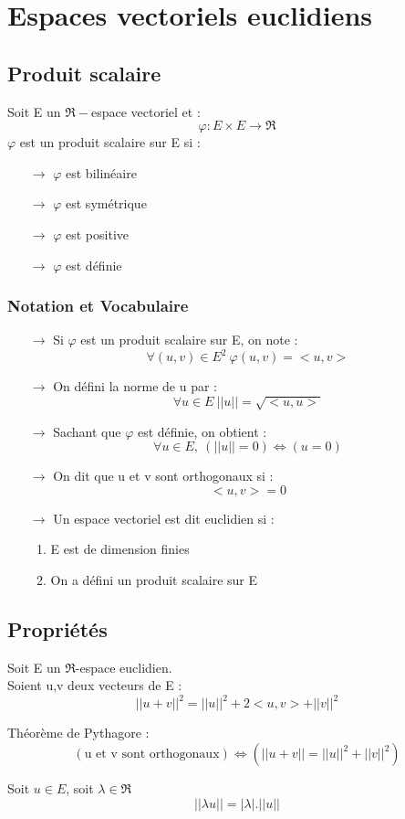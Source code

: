 
\chapter{Espaces vectoriels euclidiens}
\section{Produit scalaire}
\begin{de}
Soit E un $\Re-$espace vectoriel et :
$$\varphi : E\times E \rightarrow \Re$$
$\varphi$ est un produit scalaire sur E si :
\begin{itemize}
 \item[$\rightarrow$] $\varphi$ est bilinéaire
 \item[$\rightarrow$] $\varphi$ est symétrique
 \item[$\rightarrow$] $\varphi$ est positive
 \item[$\rightarrow$] $\varphi$ est définie
\end{itemize}
\end{de}
\subsection{Notation et Vocabulaire}
\begin{itemize}
\item[$\rightarrow$] Si $\varphi$ est un produit scalaire sur E, on note : $$\forall(u,v) \in E^2~ \varphi(u,v) = <u,v>$$
 \item[$\rightarrow$] On défini la norme de u par : $$\forall u \in E~ ||u|| = \sqrt{<u,u>}$$
 \item[$\rightarrow$] Sachant que $\varphi$ est définie, on obtient : $$\forall u \in E,~ (||u||=0) \Leftrightarrow (u=0)$$
 \item[$\rightarrow$] On dit que u et v sont orthogonaux si : $$<u,v>=0$$
 \item[$\rightarrow$] Un espace vectoriel est dit euclidien si : \begin{enumerate}[1-]
 \item E est de dimension finies 
 \item On a défini un produit scalaire sur E
\end{enumerate}
\end{itemize}
\section{Propriétés}
\begin{prop}
Soit E un $\Re$-espace euclidien.\\
Soient u,v deux vecteurs de E : 
$$||u+v||^2 = ||u||^2 + 2<u,v> + ||v||^2$$
\end{prop}
\begin{theo}
Théorème de Pythagore : $$(\mbox{u et v sont orthogonaux}) \Leftrightarrow (||u+v|| = ||u||^2+||v||^2)$$
\end{theo}
\begin{prop}
 Soit $u \in E$, soit $\lambda \in \Re$
$$||\lambda u|| = |\lambda|.||u||$$
\end{prop}

